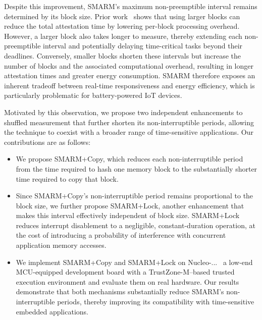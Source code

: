 \documentclass[conference]{IEEEtran}
\newcommand{\smarmcopy}{SMARM+Copy\xspace}
\newcommand{\smarmlock}{SMARM+Lock\xspace}
\begin{document}
Despite this improvement, SMARM's maximum non-preemptible interval remains determined by its block size. Prior work~\cite{} shows that using larger blocks can reduce the total attestation time by lowering per-block processing overhead. However, a larger block also takes longer to measure, thereby extending each non-preemptible interval and potentially delaying time-critical tasks beyond their deadlines. Conversely, smaller blocks shorten these intervals but increase the number of blocks and the associated computational overhead, resulting in longer attestation times and greater energy consumption. SMARM therefore exposes an inherent tradeoff between real-time responsiveness and energy efficiency, which is particularly problematic for battery-powered IoT devices.

Motivated by this observation, we propose two independent enhancements to shuffled measurement that further shorten its non-interruptible periods, allowing the technique to coexist with a broader range of time-sensitive applications. 
Our contributions are as follows:

\begin{itemize}
\item We propose \smarmcopy, which reduces each non-interruptible period from the time required to hash one memory block to the substantially shorter time required to copy that block.

\item Since \smarmcopy's non-interruptible period remains proportional to the block size, we further propose \smarmlock, another enhancement that makes this interval effectively independent of block size. 
\smarmlock reduces interrupt disablement to a negligible, constant-duration operation, at the cost of introducing a probability of interference with concurrent application memory accesses.

\item We implement \smarmcopy and \smarmlock on Nucleo-...~\cite{} a low-end MCU-equipped development board with a TrustZone-M--based trusted execution environment and evaluate them on real hardware. Our results demonstrate that both mechanisms substantially reduce SMARM's non-interruptible periods, thereby improving its compatibility with time-sensitive embedded applications.

\end{itemize}
\end{document}
